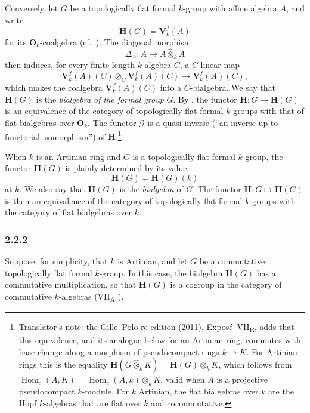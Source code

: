 Conversely, let \(G\) be a topologically flat formal \(k\)-group with
affine algebra \(A\), and write
\[
  \mathbf H(G)=\mathbf V_k^f(A)
\]
for its \(\mathbf O_k\)-coalgebra \textup{(cf.\ )}. The
diagonal morphism
\[
  \Delta_A:A\longrightarrow A\widehat\otimes_kA
\]
then induces, for every finite-length \(k\)-algebra \(C\), a
\(C\)-linear map
\[
  \mathbf V_k^f(A)(C)
  \otimes_C
  \mathbf V_k^f(A)(C)
  \longrightarrow
  \mathbf V_k^f(A)(C),
\]
which makes the coalgebra \(\mathbf V_k^f(A)(C)\) into a
\(C\)-bialgebra. We say that \(\mathbf H(G)\) is the \emph{bialgebra of the formal group}
\(G\). By , the functor \(\mathbf H:G\mapsto\mathbf H(G)\) is an
equivalence of the category of topologically flat formal \(k\)-groups
with that of flat bialgebras over \(\mathbf O_k\). The functor
\(\mathscr G\) is a quasi-inverse (``an inverse up to functorial
isomorphism'') of \(\mathbf H\).\footnote{Translator's note: the Gille--Polo re-edition (2011),
Exposé~VII\textsubscript{B}, adds that this equivalence, and its analogue
below for an Artinian ring, commutes with base change along a morphism of
pseudocompact rings \(k\to K\). For Artinian rings this is the equality
\(\mathbf H(G\widehat\otimes_kK)=\mathbf H(G)\otimes_kK\), which follows from
\(\operatorname{Hom}_c(A,K)=\operatorname{Hom}_c(A,k)\otimes_kK\), valid when
\(A\) is a projective pseudocompact \(k\)-module. For \(k\) Artinian, the flat
bialgebras over \(k\) are the Hopf \(k\)-algebras that are flat over \(k\) and
cocommutative.}

When \(k\) is an Artinian ring and \(G\) is a topologically flat
formal \(k\)-group, the functor \(\mathbf H(G)\) is plainly
determined by its value
\[
  \mathbf H(G)=\mathbf H(G)(k)
\]
at \(k\). We also say that \(\mathbf H(G)\) is the \emph{bialgebra} of \(G\). The
functor \(\mathbf H:G\mapsto\mathbf H(G)\) is then an equivalence of the
category of topologically flat formal \(k\)-groups with the category of
flat bialgebras over \(k\).

\subsubsection*{2.2.2}
\label{sga3:VIIB:2.2.2}

Suppose, for simplicity, that \(k\) is Artinian, and let \(G\) be a
commutative, topologically flat formal \(k\)-group. In this case, the
bialgebra \(\mathbf H(G)\) has a commutative multiplication, so that
\(\mathbf H(G)\) is a cogroup in the category of commutative
\(k\)-algebras \textup{(VII\textsubscript{A} )}.

